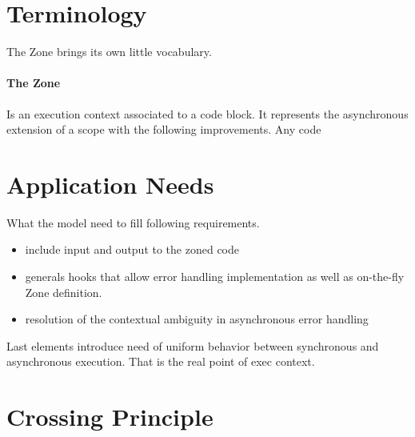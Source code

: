 



\section{Terminology}

The Zone brings its own little vocabulary.

\paragraph{The Zone}

Is an execution context associated to a code block. It represents the asynchronous extension of a scope with the following improvements. Any code 

\section{Application Needs}

What the model need to fill following requirements.

\begin{itemize}
\item include input and output to the zoned code
\item generals hooks that allow error handling implementation as well as on-the-fly Zone definition.
\item resolution of the contextual ambiguity in asynchronous error handling
\end{itemize}

Last elements introduce need of uniform behavior between synchronous and asynchronous execution.
That is the real point of exec context.

\section{Crossing Principle}

